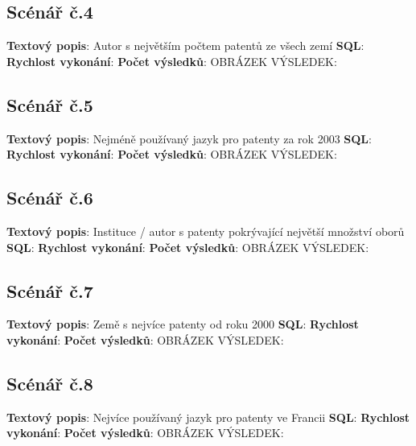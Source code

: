 \subsection{Scénář č.4}
\textbf{Textový popis}: Autor s největším počtem patentů ze všech zemí
\newline
\textbf{SQL}: 
\newline
\textbf{Rychlost vykonání}: 
\newline
\textbf{Počet výsledků}:
\newline
OBRÁZEK VÝSLEDEK:

\subsection{Scénář č.5}
\textbf{Textový popis}: Nejméně používaný jazyk pro patenty za rok 2003
\newline
\textbf{SQL}: 
\newline
\textbf{Rychlost vykonání}: 
\newline
\textbf{Počet výsledků}:
\newline
OBRÁZEK VÝSLEDEK:

\subsection{Scénář č.6}
\textbf{Textový popis}: Instituce / autor s patenty pokrývající největší množství oborů
\newline
\textbf{SQL}: 
\newline
\textbf{Rychlost vykonání}: 
\newline
\textbf{Počet výsledků}:
\newline
OBRÁZEK VÝSLEDEK:

\subsection{Scénář č.7}
\textbf{Textový popis}: Země s nejvíce patenty od roku 2000
\newline
\textbf{SQL}: 
\newline
\textbf{Rychlost vykonání}: 
\newline
\textbf{Počet výsledků}:
\newline
OBRÁZEK VÝSLEDEK:

\subsection{Scénář č.8}
\textbf{Textový popis}: Nejvíce používaný jazyk pro patenty ve Francii
\newline
\textbf{SQL}: 
\newline
\textbf{Rychlost vykonání}: 
\newline
\textbf{Počet výsledků}:
\newline
OBRÁZEK VÝSLEDEK:

